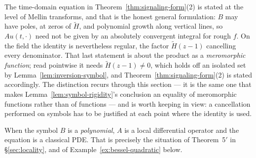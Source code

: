 \begin{remark}\label{rem:poles}
The time-domain equation in Theorem~\ref{thm:signaling-form}(2) is stated at the level of
Mellin transforms, and that is the honest general formulation: $B$ may have poles, at zeros of
$\tilde H$, and polynomial growth along vertical lines, so $A u(t, \cdot)$ need not be given by
an absolutely convergent integral for rough $f$. On the field the identity is nevertheless
regular, the factor $\tilde H(z-1)$ cancelling every denominator. That last statement is about
the product as a \emph{meromorphic function}; read pointwise it needs $\tilde H(z-1) \ne 0$,
which holds off an isolated set by Lemma~\ref{lem:inversion-symbol}, and
Theorem~\ref{thm:signaling-form}(2) is stated accordingly. The distinction recurs through this
section --- it is the same one that makes Lemma~\ref{lem:symbol-rigidity}'s conclusion an
equality of meromorphic functions rather than of functions --- and is worth keeping in view: a
cancellation performed on symbols has to be justified at each point where the identity is
used.

When the symbol $B$ is a \emph{polynomial}, $A$ is a local differential operator and the
equation is a classical PDE. That is precisely the situation of Theorem~5$'$ in
\S\ref{sec:locality}, and of Example~\ref{ex:bessel-quadratic} below.
\end{remark}

